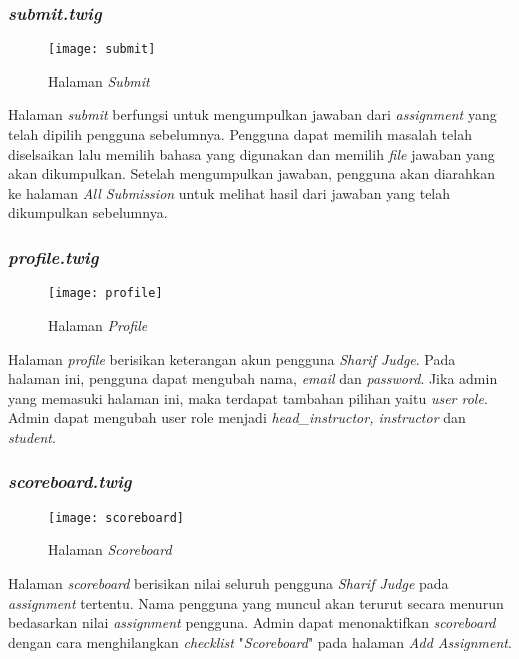 \subsubsection{\textit{submit.twig}}
\begin{figure}[H]
	\centering  
	\texttt{[image: submit]}  
	\caption[Halaman \textit{Submit}]{Halaman \textit{Submit}} 
	\label{fig:submit} 
\end{figure} 
Halaman \textit{submit} berfungsi untuk mengumpulkan jawaban dari \textit{assignment} yang telah dipilih pengguna sebelumnya. Pengguna dapat memilih masalah telah diselsaikan lalu memilih bahasa yang digunakan dan memilih \textit{file} jawaban yang akan dikumpulkan. Setelah mengumpulkan jawaban, pengguna akan diarahkan ke halaman \textit{All Submission} untuk melihat hasil dari jawaban yang telah dikumpulkan sebelumnya.

\subsubsection{\textit{profile.twig}}
\begin{figure}[H]
	\centering  
	\texttt{[image: profile]}  
	\caption[Halaman \textit{Profile}]{Halaman \textit{Profile}} 
	\label{fig:profile} 
\end{figure} 
Halaman \textit{profile} berisikan keterangan akun pengguna \textit{Sharif Judge}. Pada halaman ini, pengguna dapat mengubah nama, \textit{email} dan \textit{password}. Jika admin yang memasuki halaman ini, maka terdapat tambahan pilihan yaitu \textit{user role}. Admin dapat mengubah user role menjadi \textit{head\_instructor, instructor} dan \textit{student}.

\subsubsection{\textit{scoreboard.twig}}
\begin{figure}[H]
	\centering  
	\texttt{[image: scoreboard]}  
	\caption[Halaman \textit{Scoreboard}]{Halaman \textit{Scoreboard}} 
	\label{fig:scoreboard} 
\end{figure} 
Halaman \textit{scoreboard} berisikan nilai seluruh pengguna \textit{Sharif Judge} pada \textit{assignment} tertentu. Nama pengguna yang muncul akan terurut secara menurun bedasarkan nilai \textit{assignment} pengguna. Admin dapat menonaktifkan \textit{scoreboard} dengan cara menghilangkan \textit{checklist} "\textit{Scoreboard}" pada halaman \textit{Add Assignment}.

